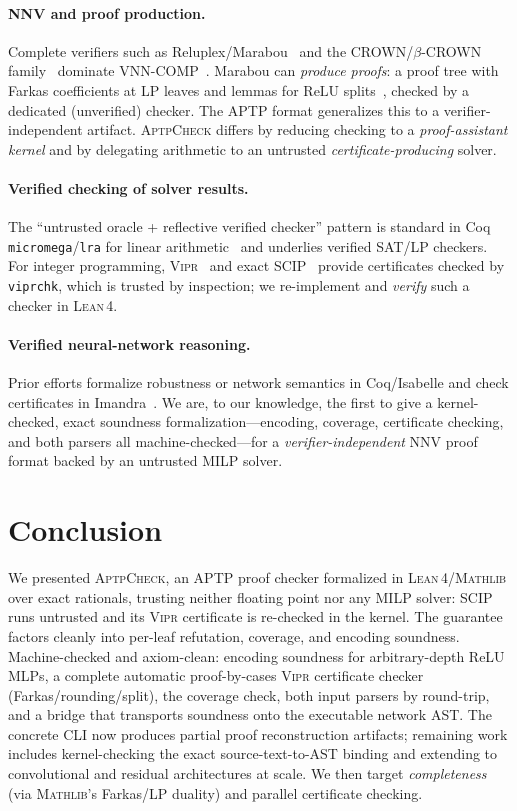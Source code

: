 \documentclass[runningheads]{llncs}
\newcommand{\vipr}{\textsc{Vipr}}
\newcommand{\scip}{\textsc{SCIP}}
\newcommand{\tool}{\textsc{AptpCheck}}
\newcommand{\lean}{\textsc{Lean\,4}}
\newcommand{\mathlib}{\textsc{Mathlib}}
\newcommand{\relu}{\ensuremath{\mathrm{ReLU}}}
\newcommand{\code}[1]{\texttt{#1}}
\begin{document}
\paragraph{NNV and proof production.} Complete verifiers such as
Reluplex/Marabou~\cite{katz2017reluplex} and the CROWN/$\beta$-CROWN
family~\cite{wang2021betacrown} dominate VNN-COMP~\cite{vnncomp2023}. Marabou can
\emph{produce proofs}: a proof tree with Farkas coefficients at LP leaves and lemmas
for \relu{} splits~\cite{isac2022marabou}, checked by a dedicated (unverified)
checker. The APTP format generalizes this to a verifier-independent artifact. \tool{}
differs by reducing checking to a \emph{proof-assistant kernel} and by delegating
arithmetic to an untrusted \emph{certificate-producing} solver.

\paragraph{Verified checking of solver results.} The ``untrusted oracle + reflective
verified checker'' pattern is standard in Coq \code{micromega}/\code{lra} for linear
arithmetic~\cite{besson2007micromega} and underlies verified SAT/LP checkers. For
integer programming, \vipr~\cite{cheung2017vipr} and exact
\scip~\cite{eifler2022exact} provide certificates checked by \code{viprchk}, which is
trusted by inspection; we re-implement and \emph{verify} such a checker in \lean.

\paragraph{Verified neural-network reasoning.} Prior efforts formalize robustness or
network semantics in Coq/Isabelle and check certificates in
Imandra~\cite{desmartin2022checkinn}. We are, to our knowledge, the first to give a
kernel-checked, exact soundness formalization---encoding, coverage, certificate
checking, and both parsers all machine-checked---for a \emph{verifier-independent}
NNV proof format backed by an untrusted MILP solver.

\section{Conclusion}\label{sec:conclusion}

We presented \tool, an APTP proof checker formalized in \lean/\mathlib{} over exact
rationals, trusting neither floating point nor any MILP solver: \scip{} runs untrusted
and its \vipr{} certificate is re-checked in the kernel. The guarantee factors cleanly
into per-leaf refutation, coverage, and encoding soundness. Machine-checked and
axiom-clean: encoding soundness for arbitrary-depth ReLU MLPs, a complete automatic
proof-by-cases \vipr{} certificate checker (Farkas/rounding/split), the coverage
check, both input parsers by round-trip, and a bridge that transports soundness onto
the executable network AST. The concrete CLI now produces partial proof
reconstruction artifacts; remaining work includes kernel-checking the exact
source-text-to-AST binding and extending to convolutional and residual architectures
at scale. We then target \emph{completeness} (via \mathlib's Farkas/LP duality) and
parallel certificate checking.



\end{document}
